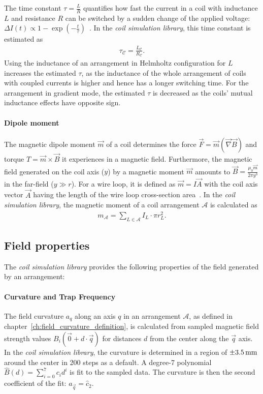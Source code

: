 The time constant $\tau = \frac{L}{R}$ quantifies how fast the current in a coil with inductance $L$ and resistance $R$ can be switched by a sudden change of the applied voltage: $\Delta I(t) \propto 1-\exp \left(-\frac{t}{\tau}\right)$~\cite{demtroder_zeitlich_2013}. In the \textit{coil simulation library}, this time constant is estimated as
\begin{align}\label{eq:time_constant_simulation}
    \tau_\mathcal{C} = \frac{L_\mathcal{C}}{R_\mathcal{C}}.
\end{align}
Using the inductance of an arrangement in Helmholtz configuration for $L$ increases  the estimated $\tau$, as the inductance of the whole arrangement of coils with coupled currents is higher and hence has a longer switching time. For the arrangement in gradient mode, the estimated $\tau$ is decreased as the coils' mutual inductance effects have opposite sign. 

\paragraph{Dipole moment}
The magnetic dipole moment $\vec m$ of a coil determines the force $\vec F = \vec m (\vec \nabla \vec B)$ and torque $T = \vec m \times \vec B$ it experiences in a magnetic field. Furthermore, the magnetic field generated on the coil axis ($y$) by a magnetic moment $\vec m$ amounts to $\vec B = \frac{\mu_0 \vec m}{2\pi y^3}$ in the far-field ($y \gg r$). For a wire loop, it is defined as $\vec m = I \vec A$ with the coil axis vector $\vec A$ having the length of the wire loop cross-section area~\cite{demtroder_statische_2013}. In the \textit{coil simulation library}, the magnetic moment of a coil arrangement $\mathcal{A}$ is calculated as
\begin{align}\label{eq:dipole_moment_simulation}
    m_\mathcal{A} = \sum\limits_{L \in \mathcal{A}} I_L \cdot \pi r_L^2.
\end{align}

\subsection*{Field properties}
The \textit{coil simulation library} provides the following properties of the field generated by an arrangement:

\paragraph{Curvature and Trap Frequency}
The field curvature $a_q$ along an axis $q$ in an arrangement $\mathcal{A}$, as defined in chapter~\ref{ch:field_curvature_definition}, is calculated from sampled magnetic field strength values $B_i(\vec 0 + d \cdot \vec q)$ for distances $d$ from the center along the $\vec q$ axis. In the \textit{coil simulation library}, the curvature is determined in a region of $\SI{+-3.5}{\milli\meter}$ around the center in \SI{200}{} steps as a default. A degree-7 polynomial $\hat B(d) = \sum\limits_{i=0}^7 c_i d^i$ is fit to the sampled data. The curvature is then the second coefficient of the fit: $a_{\vec q} = \hat c_2$.


